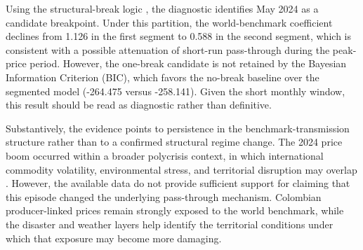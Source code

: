 \documentclass[11pt]{article}
\begin{document}
Using the structural-break logic \citep{BaiPerron1998,BaiPerron2003}, the diagnostic identifies May 2024 as a candidate breakpoint. Under this partition, the world-benchmark coefficient declines from 1.126 in the first segment to 0.588 in the second segment, which is consistent with a possible attenuation of short-run pass-through during the peak-price period. However, the one-break candidate is not retained by the Bayesian Information Criterion (BIC), which favors the no-break baseline over the segmented model (-264.475 versus -258.141). Given the short monthly window, this result should be read as diagnostic rather than definitive.

Substantively, the evidence points to persistence in the benchmark-transmission structure rather than to a confirmed structural regime change. The 2024 price boom occurred within a broader polycrisis context, in which international commodity volatility, environmental stress, and territorial disruption may overlap \citep{Mechler2025}. However, the available data do not provide sufficient support for claiming that this episode changed the underlying pass-through mechanism. Colombian producer-linked prices remain strongly exposed to the world benchmark, while the disaster and weather layers help identify the territorial conditions under which that exposure may become more damaging.
\end{document}
